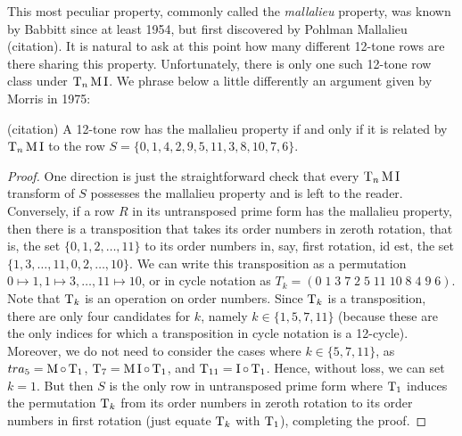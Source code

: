 This most peculiar property, commonly called the \emph{mallalieu} property, was known by Babbitt since at least 1954, but first discovered by Pohlman Mallalieu (citation). It is natural to ask at this point how many different 12-tone rows are there sharing this property. Unfortunately, there is only one such 12-tone row class under $\operatorname{T}_n\operatorname{M}\operatorname{I}$. We phrase below a little differently an argument given by Morris in 1975:

\begin{proposition} (citation) \label{mallalieu-Morris} A 12-tone row has the mallalieu property if and only if it is related by $\operatorname{T}_n\operatorname{M}\operatorname{I}$ to the row $S = \{ 0, 1, 4, 2, 9, 5, 11, 3, 8, 10, 7, 6 \}$.

\begin{proof} One direction is just the straightforward check that every $\operatorname{T}_n\operatorname{M}\operatorname{I}$ transform of $S$ possesses the mallalieu property and is left to the reader. Conversely, if a row $R$ in its untransposed prime form has the mallalieu property, then there is a transposition that takes its order numbers in zeroth rotation, that is, the set $\{ 0, 1, 2, \dots, 11 \}$ to its order numbers in, say, first rotation, id est, the set $\{ 1, 3, \dots, 11, 0, 2, \dots, 10 \}$. We can write this transposition as a permutation $0 \mapsto 1, 1 \mapsto 3, \dots, 11 \mapsto 10 $, or in cycle notation as $T_k = ( 0 \; 1 \; 3 \; 7 \; 2 \; 5 \; 11 \; 10 \; 8 \; 4 \; 9 \; 6 )$. Note that $\operatorname{T}_k$ is an operation on order numbers. Since $\operatorname{T}_k$ is a transposition, there are only four candidates for $k$, namely $k \in \{ 1, 5, 7, 11 \}$ (because these are the only indices for which a transposition in cycle notation is a 12-cycle). Moreover, we do not need to consider the cases where $k \in \{5, 7, 11\}$, as $tra_5 = \operatorname{M} \circ \operatorname{T}_1$, $\operatorname{T}_7 = \operatorname{M}\operatorname{I} \circ \operatorname{T}_1$, and $\operatorname{T}_{11} = \operatorname{I} \circ \operatorname{T}_1$. Hence, without loss, we can set $k = 1$. But then $S$ is the only row in untransposed prime form where $\operatorname{T}_1$ induces the permutation $\operatorname{T}_k$ from its order numbers in zeroth rotation to its order numbers in first rotation (just equate $\operatorname{T}_k$ with $\operatorname{T}_1$), completing the proof.
\end{proof}
\end{proposition}

